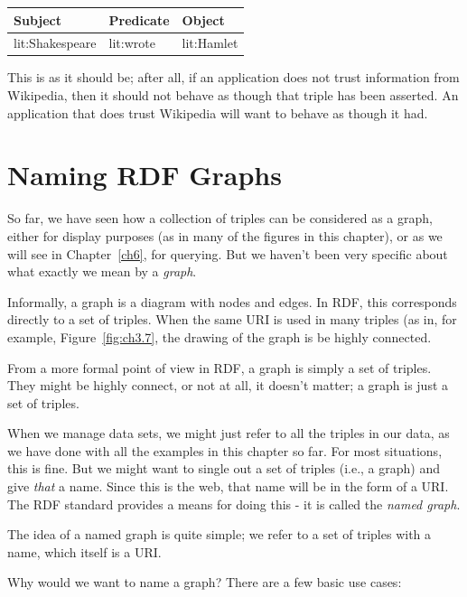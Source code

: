 \phantom{I}

\begin{tabular}{|lll|}
\hline
Subject&Predicate&Object\\
\hline
lit:Shakespeare&lit:wrote&lit:Hamlet \\
\hline
\end{tabular}

\phantom{I}

This is as it should be; after all, if an application does not trust
information from Wikipedia, then it should not behave as though that
triple has been asserted. An application that does trust Wikipedia will
want to behave as though it had.


\section{Naming RDF Graphs}
So far, we have seen how a collection of triples can be considered as a graph,
either for display purposes (as in many of the figures in this chapter), or as we will
see in Chapter~\ref{ch6}, for querying.  But we haven't been very
specific about what exactly we mean by a \emph{graph}.

Informally, a graph is a diagram with nodes and edges.  In RDF, this
corresponds directly to a set of triples.  When the same URI is used in
many triples (as in, for example, Figure~\ref{fig:ch3.7}, the drawing
of the graph is be highly connected.

From a more formal point of view in RDF, a graph is simply a set of
triples. They might be highly connect, or not at all, it doesn't
matter; a graph is just a set of triples.

When we manage data sets, we might just refer to all the triples in
our data, as we have done with all the examples in this chapter so
far.  For most situations, this is fine.  But we might want to single
out a set of triples (i.e., a graph) and give \emph{that} a name.
Since this is the web, that name will be in the form of a URI.  The
RDF standard provides a means for doing this - it is called the
\emph{named graph}.

The idea of a named graph is quite simple; we refer to a set of
triples with a name, which itself is a URI. 

Why would we want to name a graph?  There are a few basic use cases:

